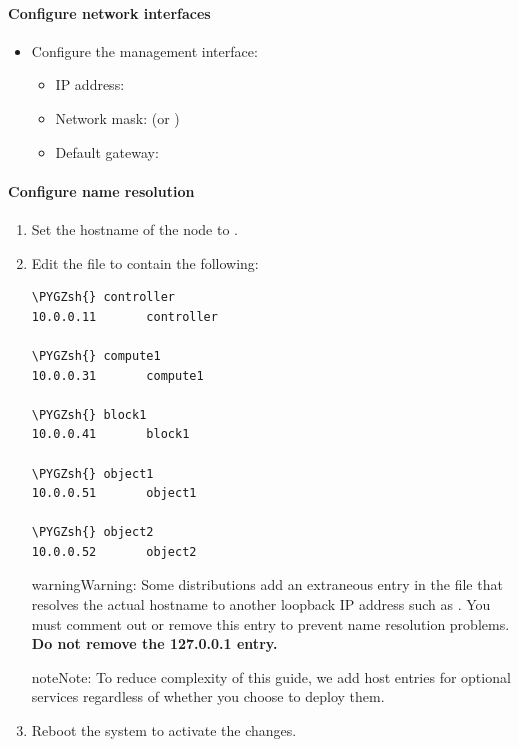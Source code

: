 \documentclass[letterpaper,10pt,english]{sphinxmanual}
\def\PYGZsh{\char`\#}
\begin{document}
\paragraph{Configure network interfaces}
\label{_source/installation_guide/environment-networking-storage-cinder:configure-network-interfaces}\begin{itemize}
\item {} 
Configure the management interface:
\begin{itemize}
\item {} 
IP address: 

\item {} 
Network mask:  (or )

\item {} 
Default gateway: 

\end{itemize}

\end{itemize}


\paragraph{Configure name resolution}
\label{_source/installation_guide/environment-networking-storage-cinder:configure-name-resolution}\begin{enumerate}
\item {} 
Set the hostname of the node to .

\item {} 
Edit the  file to contain the following:

\begin{Verbatim}[commandchars=\\\{\}]
\PYGZsh{} controller
10.0.0.11       controller

\PYGZsh{} compute1
10.0.0.31       compute1

\PYGZsh{} block1
10.0.0.41       block1

\PYGZsh{} object1
10.0.0.51       object1

\PYGZsh{} object2
10.0.0.52       object2
\end{Verbatim}

\begin{notice}{warning}{Warning:}
Some distributions add an extraneous entry in the 
file that resolves the actual hostname to another loopback IP
address such as . You must comment out or remove this
entry to prevent name resolution problems. \textbf{Do not remove the
127.0.0.1 entry.}
\end{notice}

\begin{notice}{note}{Note:}
To reduce complexity of this guide, we add host entries for optional
services regardless of whether you choose to deploy them.
\end{notice}

\item {} 
Reboot the system to activate the changes.

\end{enumerate}
\end{document}
